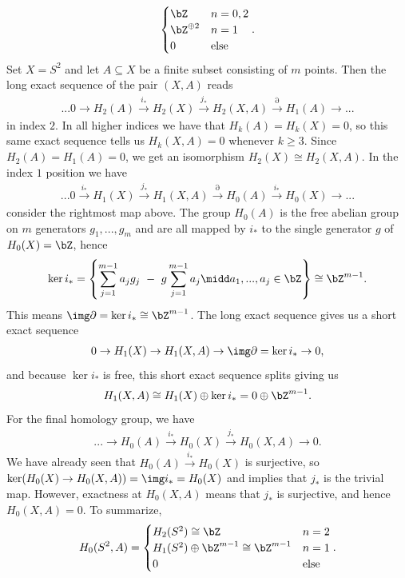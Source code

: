 \begin{homework}[e]
\begin{prf}
\begin{enumerate}[(a)]
\begin{align*}
\begin{cases}
          \bZ & n = 0,2 \\
          \bZ^{\oplus 2} & n = 1 \\
          0 & \text{else}
        \end{cases}.
      \end{align*}
      Set $X = S^2$ and let $A \subseteq X$ be a finite subset consisting of $m$ points. Then the long exact sequence of the pair $(X,A)$ reads
      \begin{align*}
        ... 0 \to H_2(A) \xrightarrow{i_*} H_2(X) \xrightarrow{j_*} H_2(X,A) \xrightarrow{\partial} H_1(A) \to ...
      \end{align*}
      in index $2$. In all higher indices we have that $H_k(A) = H_k(X) = 0$, so this same exact sequence tells us $H_k(X,A) = 0$ whenever $k \geq 3$. Since $H_2(A) = H_1(A) = 0$, we get an isomorphism $H_2(X) \cong H_2(X,A)$. In the index $1$ position we have
      \begin{align*}
        ... 0 \xrightarrow{i_*} H_1(X) \xrightarrow{j_*} H_1(X,A) \xrightarrow{\partial} H_0(A) \xrightarrow{i_*} H_0(X) \to ...
      \end{align*}
      consider the rightmost map above. The group $H_0(A)$ is the free abelian group on $m$ generators $g_1,...,g_m$ and are all mapped by $i_*$ to the single generator $g$ of $H_0(X) = \bZ$, hence
      \begin{align*}
        \ker i_* = \left\{\sum_{j=1}^{m-1} a_jg_j ~-~ g \sum_{j=1}^{m-1}a_j \midd a_1,...,a_j \in \bZ\right\} \cong \bZ^{m-1}.
      \end{align*}
      This means $\img \partial = \ker i_* \cong \bZ^{m-1}$. The long exact sequence gives us a short exact sequence
      \begin{align*}
        0 \to H_1(X) \to H_1(X,A) \to \img \partial = \ker i_* \to 0,
      \end{align*}
      and because $\ker i_*$ is free, this short exact sequence splits giving us
      \begin{align*}
        H_1(X,A) \cong H_1(X) \oplus \ker i_* = 0 \oplus \bZ^{m-1}.
      \end{align*}
      For the final homology group, we have
      \begin{align*}
        ... \to H_0(A) \xrightarrow{i_*} H_0(X)\xrightarrow{j_*} H_0(X,A) \to 0.
      \end{align*}
      We have already seen that $H_0(A)\xrightarrow{i_*}H_0(X)$ is surjective, so $\ker (H_0(X) \to H_0(X,A)) = \img i_* = H_0(X)$ and implies that $j_*$ is the trivial map. However, exactness at $H_0(X,A)$ means that $j_*$ is surjective, and hence $H_0(X,A) = 0$. To summarize,
      \begin{align*}
        H_0(S^2,A) =
        \begin{cases}
          H_2(S^2) \cong \bZ & n = 2 \\
          H_1(S^2) \oplus \bZ^{m-1} \cong \bZ^{m-1} & n = 1 \\
          0 & \text{else}
        \end{cases}.
  \end{align*}


\end{enumerate}
\end{prf}
\end{homework}
